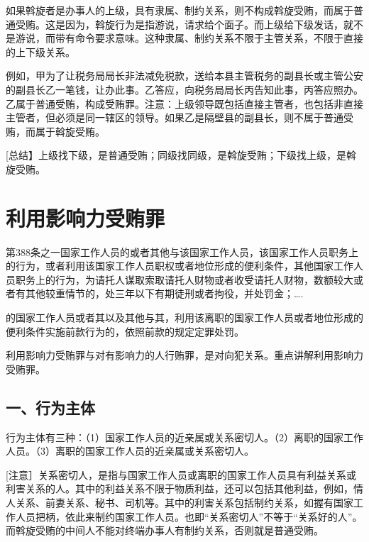 如果斡旋者是办事人的上级，具有隶属、制约关系，则不构成斡旋受贿，而属于普通受贿。这是因为，斡旋行为是指游说，请求给个面子。而上级给下级发话，就不是游说，而带有命令要求意味。这种隶属、制约关系不限于主管关系，不限于直接的上下级关系。

例如，甲为了让税务局局长非法减免税款，送给本县主管税务的副县长或主管公安的副县长乙一笔钱，让办此事。乙答应，向税务局局长丙告知此事，丙答应照办。乙属于普通受贿，构成受贿罪。注意：上级领导既包括直接主管者，也包括非直接主管者，但必须是同一辖区的领导。如果乙是隔壁县的副县长，则不属于普通受贿，而属于斡旋受贿。

[总结】上级找下级，是普通受贿；同级找同级，是斡旋受贿；下级找上级，是斡旋受贿。

\section{利用影响力受贿罪}

第388条之一国家工作人员的或者其他与该国家工作人员，该国家工作人员职务上的行为，或者利用该国家工作人员职权或者地位形成的便利条件，其他国家工作人员职务上的行为，为请托人谋取索取请托人财物或者收受请托人财物，数额较大或者有其他较重情节的，处三年以下有期徒刑或者拘役，并处罚金；….

的国家工作人员或者其以及其他与其，利用该离职的国家工作人员或者地位形成的便利条件实施前款行为的，依照前款的规定定罪处罚。


利用影响力受贿罪与对有影响力的人行贿罪，是对向犯关系。重点讲解利用影响力受贿罪。

\subsection*{一、行为主体}

行为主体有三种：（1）国家工作人员的近亲属或关系密切人。（2）离职的国家工作人员。（3）离职的国家工作人员的近亲属或关系密切人。

[注意］关系密切人，是指与国家工作人员或离职的国家工作人员具有利益关系或利害关系的人。其中的利益关系不限于物质利益，还可以包括其他利益，例如，情人关系、前妻关系、秘书、司机等。其中的利害关系包括制约关系，如握有国家工作人员把柄，依此来制约国家工作人员。也即“关系密切人”不等于“关系好的人”。而斡旋受贿的中间人不能对终端办事人有制约关系，否则就是普通受贿。

